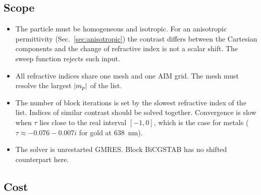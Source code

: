 \documentclass[11pt,a4paper]{article}
\begin{document}
\subsection{Scope}
\label{sec:shift-scope}

\begin{itemize}
  \item The particle must be homogeneous and isotropic.
        For an anisotropic permittivity (Sec.~\ref{sec:anisotropic}) the
        contrast differs between the Cartesian components and the
        change of refractive index is not a scalar shift.
        The sweep function rejects such input.
  \item All refractive indices share one mesh and one AIM grid.
        The mesh must resolve the largest $\abs{m_p}$ of the list.
  \item The number of block iterations is set by the slowest
        refractive index of the list.
        Indices of similar contrast should be solved together.
        Convergence is slow when $\tau$ lies close to the real interval
        $[-1, 0]$, which is the case for metals
        ($\tau \approx -0.076 - 0.007i$ for gold at
        \SI{638}{\nano\meter}).
  \item The solver is unrestarted GMRES.
        Block BiCGSTAB has no shifted counterpart here.
\end{itemize}

\subsection{Cost}
\label{sec:shift-cost}
\end{document}
